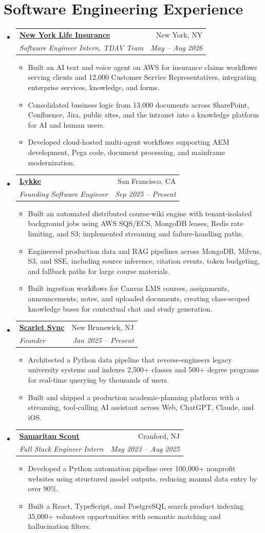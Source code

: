 \documentclass[letterpaper,11pt]{article}
\makeatletter
\newcommand{\resumeItem}[1]{
  \item\small{
    {#1 \vspace{-2pt}}
  }
}
\newcommand{\resumeSubheading}[4]{
  \vspace{-2pt}\item
    \begin{tabular*}{0.97\textwidth}[t]{l@{\extracolsep{\fill}}r}
      \textbf{#1} & #2 \\
      \textit{\small#3} & \textit{\small #4} \\
    \end{tabular*}\vspace{-7pt}
}
\newcommand{\resumeSubHeadingListStart}{\begin{itemize}[leftmargin=0.15in, label={}]}
\newcommand{\resumeSubHeadingListEnd}{\end{itemize}}
\newcommand{\resumeItemListStart}{\begin{itemize}}
\newcommand{\resumeItemListEnd}{\end{itemize}\vspace{-5pt}}
\makeatother
\begin{document}
\section{Software Engineering Experience}
  \resumeSubHeadingListStart
    \resumeSubheading
      {\href{https://newyorklife.com/}{New York Life Insurance}}{New York, NY}
      {Software Engineer Intern, TDAV Team}{May -- Aug 2026}
      \resumeItemListStart
        \resumeItem{Built an AI text and voice agent on AWS for insurance claims workflows serving clients and 12,000 Customer Service Representatives, integrating enterprise services, knowledge, and forms.}
        \resumeItem{Consolidated business logic from 13,000 documents across SharePoint, Confluence, Jira, public sites, and the intranet into a knowledge platform for AI and human users.}
        \resumeItem{Developed cloud-hosted multi-agent workflows supporting AEM development, Pega code, document processing, and mainframe modernization.}
      \resumeItemListEnd
    \newpage
    \resumeSubheading
      {\href{https://getlykke.com/}{Lykke}}{San Francisco, CA}
      {Founding Software Engineer}{Sep 2025 -- Present}
      \resumeItemListStart
        \resumeItem{Built an automated distributed course-wiki engine with tenant-isolated background jobs using AWS SQS/ECS, MongoDB leases, Redis rate limiting, and S3; implemented streaming and failure-handling paths.}
        \resumeItem{Engineered production data and RAG pipelines across MongoDB, Milvus, S3, and SSE, including source inference, citation events, token budgeting, and fallback paths for large course materials.}
        \resumeItem{Built ingestion workflows for Canvas LMS courses, assignments, announcements, notes, and uploaded documents, creating class-scoped knowledge bases for contextual chat and study generation.}
      \resumeItemListEnd
    \resumeSubheading
      {\href{https://scarletsync.app/}{Scarlet Sync}}{New Brunswick, NJ}
      {Founder}{Jan 2025 -- Present}
      \resumeItemListStart
        \resumeItem{Architected a Python data pipeline that reverse-engineers legacy university systems and indexes 2,500+ classes and 500+ degree programs for real-time querying by thousands of users.}
        \resumeItem{Built and shipped a production academic-planning platform with a streaming, tool-calling AI assistant across Web, ChatGPT, Claude, and iOS.}
      \resumeItemListEnd
    \resumeSubheading
      {\href{https://www.samaritanscout.org/}{Samaritan Scout}}{Cranford, NJ}
      {Full Stack Engineer Intern}{May 2023 -- Aug 2025}
      \resumeItemListStart
        \resumeItem{Developed a Python automation pipeline over 100,000+ nonprofit websites using structured model outputs, reducing manual data entry by over 90\%.}
        \resumeItem{Built a React, TypeScript, and PostgreSQL search product indexing 35,000+ volunteer opportunities with semantic matching and hallucination filters.}
      \resumeItemListEnd
  \resumeSubHeadingListEnd
\end{document}
